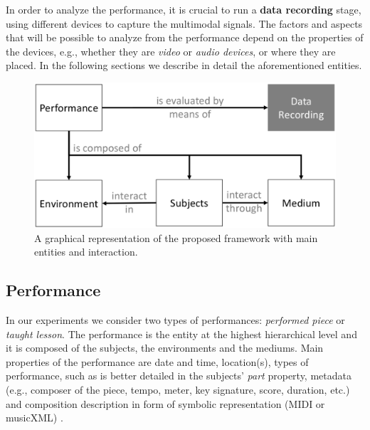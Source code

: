 


In order to analyze the performance, it is crucial to run a \textbf{data recording} stage, using different devices to capture the multimodal signals. The factors and aspects that will be possible to analyze from the performance depend on the properties of the devices, e.g., whether they are \textit{video} or \textit{audio devices}, or where they are placed. In the following sections we describe in detail the aforementioned entities.



\begin{figure}[t]
	\centering
	\includegraphics[width=\columnwidth]{img/framework.eps}
	\caption{A graphical representation of the proposed framework with main entities and interaction.}
	\label{fig:framework}
\end{figure}

\subsection{Performance}
In our experiments we consider two types of performances: \textit{performed piece} or \textit{taught lesson}. The performance is the entity at the highest hierarchical level and it is composed of the subjects, the environments and the mediums. 
Main properties of the performance are date and time, location(s), types of performance, such as is better detailed in the subjects' \textit{part} property, metadata (e.g., composer of the piece, tempo, meter, key signature, score, duration, etc.) and composition  description in form of symbolic representation (MIDI or musicXML) \cite{MIDItoolbox}.

